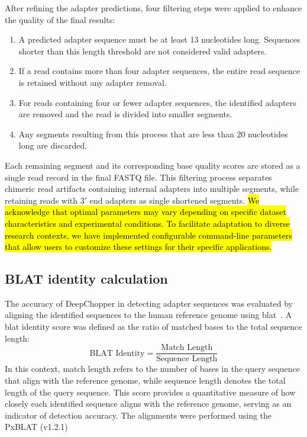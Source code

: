 \documentclass[pdflatex,sn-nature, lineno]{sn-jnl}%
\begin{document}
After refining the adapter predictions, four filtering steps were applied to enhance the quality of the final results:
\vspace{.5em}
\begin{enumerate}[leftmargin=2em]
	\item A predicted adapter sequence must be at least 13 nucleotides long. Sequences shorter than this length threshold are not considered valid adapters.
	\item If a read contains more than four adapter sequences, the entire read sequence is retained without any adapter removal.
	\item For reads containing four or fewer adapter sequences, the identified adapters are removed and the read is divided into smaller segments.
	\item Any segments resulting from this process that are less than 20 nucleotides long are discarded.
\end{enumerate}
\vspace{.5em}
Each remaining segment and its corresponding base quality scores are stored as a single read record in the final FASTQ file.
This filtering process separates chimeric read artifacts containing internal adapters into multiple segments, while retaining reads with $3'$ end adapters as single shortened segments.
\hl{We acknowledge that optimal parameters may vary depending on specific dataset characteristics and experimental conditions. To facilitate adaptation to diverse research contexts, we have implemented configurable command-line parameters that allow users to customize these settings for their specific applications.}

\subsection{BLAT identity calculation}

The accuracy of DeepChopper in detecting adapter sequences was evaluated by aligning the identified sequences to the human reference genome using \gls{blat}~\cite{kent2002blat}.
A \gls{blat} identity score was defined as the ratio of matched bases to the total sequence length:
\[
	\textrm{BLAT Identity} = \frac{\textrm{Match Length}}{\textrm{Sequence Length}}
\]
In this context, match length refers to the number of bases in the query sequence that align with the reference genome, while sequence length denotes the total length of the query sequence.
This score provides a quantitative measure of how closely each identified sequence aligns with the reference genome, serving as an indicator of detection accuracy.
The alignments were performed using the PxBLAT (v1.2.1)~\cite{li2024pxblat}
\end{document}
